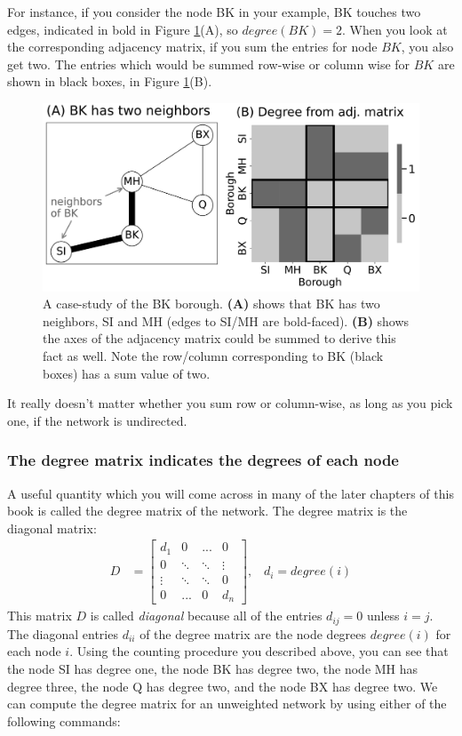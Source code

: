 For instance, if you consider the node BK in your example, BK touches two edges, indicated in bold in  Figure \ref{fig:ch4:degree}(A), so $degree({BK}) = 2$. When you look at the corresponding adjacency matrix, if you sum the entries for node ${BK}$, you also get two. The entries which would be summed row-wise or column wise for ${BK}$ are shown in black boxes, in Figure \ref{fig:ch4:degree}(B).

\begin{figure}[h]
    \centering
    \includegraphics[width=0.8\linewidth]{representations/ch4/Images/degree.png}
    \caption[Deriving node degree from layout and adjacency matrix heatmaps]{A case-study of the BK borough. \textbf{(A)} shows that BK has two neighbors, SI and MH (edges to SI/MH are bold-faced). \textbf{(B)} shows the axes of the adjacency matrix could be summed to derive this fact as well. Note the row/column corresponding to BK (black boxes) has a sum value of two.}
    \label{fig:ch4:degree}
\end{figure}

It really doesn't matter whether you sum row or column-wise, as long as you pick one, if the network is undirected.

\subsubsection{The degree matrix indicates the degrees of each node}

A useful quantity which you will come across in many of the later chapters of this book is called the {degree matrix} of the network. The degree matrix is the {diagonal} matrix:
\begin{align*}
    D &= \begin{bmatrix}
        d_1 & 0 & ... & 0 \\
        0 & \ddots & \ddots& \vdots \\
        \vdots & \ddots & \ddots & 0 \\
        0 & ... & 0 & d_n
    \end{bmatrix}, \;\;\; d_i = degree(i)
\end{align*}
This matrix $D$ is called \textit{diagonal} because all of the entries $d_{ij} = 0$ unless $i = j$. The diagonal entries $d_{ii}$ of the degree matrix are the node degrees $degree(i)$ for each node $i$. Using the counting procedure you described above, you can see that the node SI has degree one, the node BK has degree two, the node MH has degree three, the node Q has degree two, and the node BX has degree two. We can compute the degree matrix for an unweighted network by using either of the following commands:

